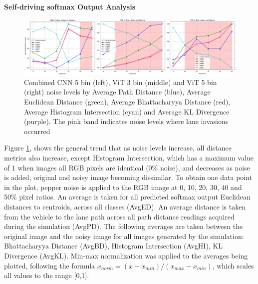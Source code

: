 \textbf{Self-driving softmax Output Analysis}








\begin{figure}[H]
    \centering
    \includegraphics[width=1.0\linewidth]{Figures/Results/combined_cnn_5bin_vit_3bin_vit_5bin_noise_distance_metrics.png}
    \caption{Combined CNN 5 bin (left), ViT 3 bin (middle) and ViT 5 bin (right) noise levels by Average Path Distance (blue), Average Euclidean Distance (green), Average Bhattacharyya Distance (red), Average Histogram Intersection (cyan) and Average KL Divergence (purple). The pink band indicates noise levels where lane invasions occurred}
    \label{fig:combined_cnn_5bin_vit_3bin_vit_5bin_noise_distance_metrics}
\end{figure}

Figure \ref{fig:combined_cnn_5bin_vit_3bin_vit_5bin_noise_distance_metrics}, shows the general trend that as noise levels increase, all distance metrics also increase, except Histogram Intersection, which has a maximum value of 1 when images all RGB pixels are identical (0\% noise), and decreases as noise is added, original and noisy image becoming dissimilar.
To obtain one data point in the plot, pepper noise is applied to the RGB image at 0, 10, 20, 30, 40 and 50\% pixel ratios. An average is taken for all predicted softmax output Euclidean distances to centroids, across all classes (AvgED). An average distance is taken from the vehicle to the lane path across all path distance readings acquired during the simulation (AvgPD). The following averages are taken between the original image and the noisy image for all images generated by the simulation: Bhattacharyya Distance (AvgBD), Histogram Intersection (AvgHI), KL Divergence (AvgKL). Min-max normalization was applied to the averages being plotted, following the formula $x_{norm} = (x - x_{min}) / (x_{max} - x_{min})$, which scales all values to the range [0,1].


